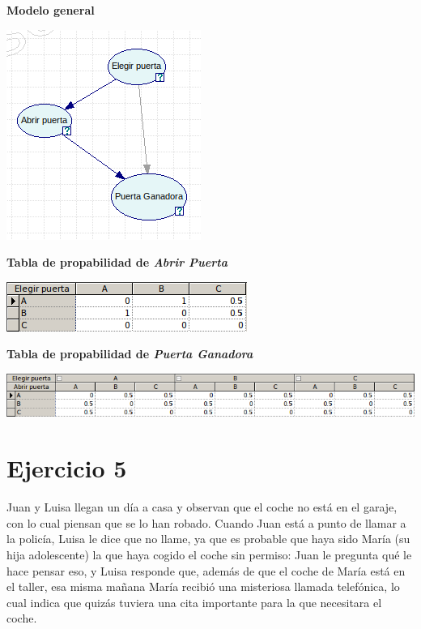 \documentclass{article}
\begin{document}
\textbf{Modelo general}

\begin{center}
\includegraphics[scale=0.5]{Modelo4.png}
\end{center}

\textbf{Tabla de propabilidad de \textit{Abrir Puerta}}

\begin{center}
\includegraphics[scale=0.5]{Abrir.png}
\end{center}

\textbf{Tabla de propabilidad de \textit{Puerta Ganadora}}

\begin{center}
\includegraphics[scale=0.5]{Ganadora.png}
\end{center}

\section{Ejercicio 5}

Juan y Luisa llegan un día a casa y observan que el coche no está en el garaje, con lo cual piensan que se lo han robado. Cuando Juan está a punto de llamar a la policía, Luisa le dice que no llame, ya que es probable que haya sido María (su hija adolescente) la que haya cogido el coche sin permiso: Juan le pregunta qué le hace pensar eso, y Luisa responde que, además de que el coche de María está en el taller, esa misma mañana María recibió una misteriosa llamada telefónica, lo cual indica que quizás tuviera una cita importante para la que necesitara el coche.
\end{document}
